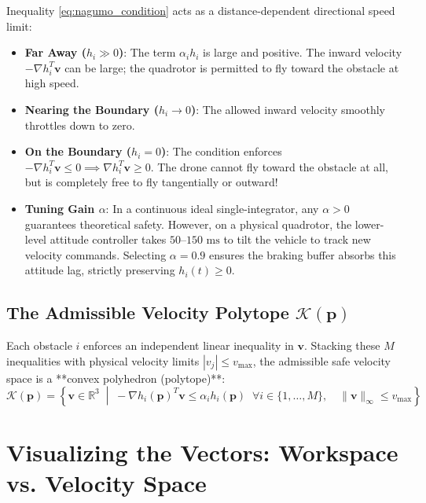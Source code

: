 \documentclass[11pt,a4paper]{article}
\begin{document}
\begin{intuitionbox}
Inequality \eqref{eq:nagumo_condition} acts as a distance-dependent directional speed limit:
\begin{itemize}
    \item \textbf{Far Away ($h_i \gg 0$)}: The term $\alpha_i h_i$ is large and positive. The inward velocity $-\nabla h_i^T \mathbf{v}$ can be large; the quadrotor is permitted to fly toward the obstacle at high speed.
    \item \textbf{Nearing the Boundary ($h_i \to 0$)}: The allowed inward velocity smoothly throttles down to zero.
    \item \textbf{On the Boundary ($h_i = 0$)}: The condition enforces $-\nabla h_i^T \mathbf{v} \le 0 \implies \nabla h_i^T \mathbf{v} \ge 0$. The drone cannot fly toward the obstacle at all, but is completely free to fly tangentially or outward!
    \item \textbf{Tuning Gain $\alpha$}: In a continuous ideal single-integrator, any $\alpha > 0$ guarantees theoretical safety. However, on a physical quadrotor, the lower-level attitude controller takes $50\text{--}150\text{ ms}$ to tilt the vehicle to track new velocity commands. Selecting $\alpha = 0.9$ ensures the braking buffer absorbs this attitude lag, strictly preserving $h_i(t) \ge 0$.
\end{itemize}
\end{intuitionbox}

\subsection{The Admissible Velocity Polytope \texorpdfstring{$\mathcal{K}(\mathbf{p})$}{K(p)}}
Each obstacle $i$ enforces an independent linear inequality in $\mathbf{v}$. Stacking these $M$ inequalities with physical velocity limits $|v_j| \le v_{\max}$, the admissible safe velocity space is a **convex polyhedron (polytope)**:
\begin{equation}
\mathcal{K}(\mathbf{p}) = \left\{ \mathbf{v} \in \mathbb{R}^3 \;\middle|\; -\nabla h_i(\mathbf{p})^T \mathbf{v} \le \alpha_i h_i(\mathbf{p}) \;\; \forall i \in \{1, \dots, M\}, \quad \|\mathbf{v}\|_\infty \le v_{\max} \right\}
\label{eq:safe_polytope}
\end{equation}

\section{Visualizing the Vectors: Workspace vs. Velocity Space}
\end{document}
